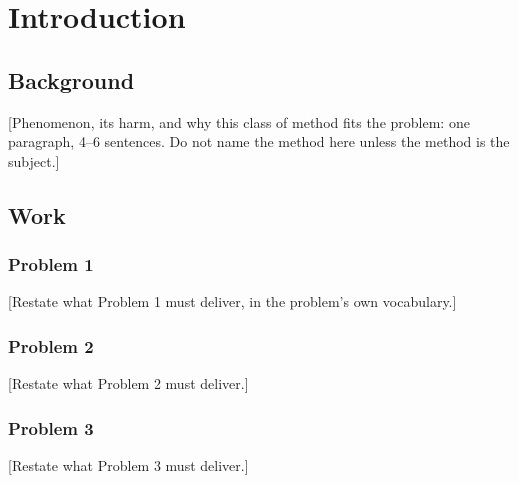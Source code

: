 \section{Introduction}

\subsection{Background}
[Phenomenon, its harm, and why this class of method fits the problem: one paragraph,
4--6 sentences. Do not name the method here unless the method is the subject.]

\subsection{Work}
\subsubsection{Problem 1}
[Restate what Problem 1 must deliver, in the problem's own vocabulary.]

\subsubsection{Problem 2}
[Restate what Problem 2 must deliver.]

\subsubsection{Problem 3}
[Restate what Problem 3 must deliver.]

